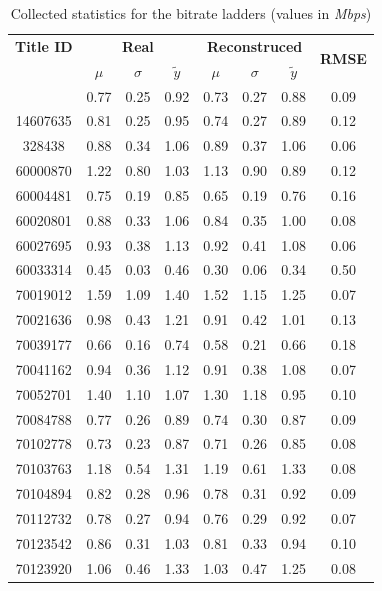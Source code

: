\begin{small}
\begin{longtable}{|c|c c c|c c c|c|}
    \caption{Collected statistics for the bitrate ladders (values in \emph{Mbps})}\label{tab:bitrate_ladders_stats}\\
\hline
\textbf{Title ID} &
\multicolumn{3}{|c}{\textbf{Real}} &
\multicolumn{3}{|c|}{\textbf{Reconstruced}} &
\multirow{2}{*}{\textbf{RMSE}} \\
& $\mu$ & $\sigma$ & $\tilde{y}$ & $\mu$ & $\sigma$ & $\tilde{y}$ & \\
\hline
\endhead
\hline
\endfoot
1151721 & 0.77 & 0.25 & 0.92 & 0.73 & 0.27 & 0.88 & 0.09 \\
14607635 & 0.81 & 0.25 & 0.95 & 0.74 & 0.27 & 0.89 & 0.12 \\
328438 & 0.88 & 0.34 & 1.06 & 0.89 & 0.37 & 1.06 & 0.06 \\
60000870 & 1.22 & 0.80 & 1.03 & 1.13 & 0.90 & 0.89 & 0.12 \\
60004481 & 0.75 & 0.19 & 0.85 & 0.65 & 0.19 & 0.76 & 0.16 \\
60020801 & 0.88 & 0.33 & 1.06 & 0.84 & 0.35 & 1.00 & 0.08 \\
60027695 & 0.93 & 0.38 & 1.13 & 0.92 & 0.41 & 1.08 & 0.06 \\
\rowcolor{lightgray}60033314 & 0.45 & 0.03 & 0.46 & 0.30 & 0.06 & 0.34 & 0.50 \\
70019012 & 1.59 & 1.09 & 1.40 & 1.52 & 1.15 & 1.25 & 0.07 \\
70021636 & 0.98 & 0.43 & 1.21 & 0.91 & 0.42 & 1.01 & 0.13 \\
70039177 & 0.66 & 0.16 & 0.74 & 0.58 & 0.21 & 0.66 & 0.18 \\
70041162 & 0.94 & 0.36 & 1.12 & 0.91 & 0.38 & 1.08 & 0.07 \\
70052701 & 1.40 & 1.10 & 1.07 & 1.30 & 1.18 & 0.95 & 0.10 \\
70084788 & 0.77 & 0.26 & 0.89 & 0.74 & 0.30 & 0.87 & 0.09 \\
70102778 & 0.73 & 0.23 & 0.87 & 0.71 & 0.26 & 0.85 & 0.08 \\
70103763 & 1.18 & 0.54 & 1.31 & 1.19 & 0.61 & 1.33 & 0.08 \\
70104894 & 0.82 & 0.28 & 0.96 & 0.78 & 0.31 & 0.92 & 0.09 \\
70112732 & 0.78 & 0.27 & 0.94 & 0.76 & 0.29 & 0.92 & 0.07 \\
70123542 & 0.86 & 0.31 & 1.03 & 0.81 & 0.33 & 0.94 & 0.10 \\
70123920 & 1.06 & 0.46 & 1.33 & 1.03 & 0.47 & 1.25 & 0.08 \\

\end{longtable}
\end{small}
